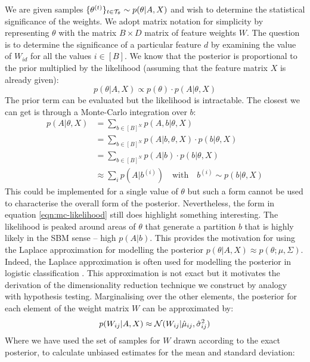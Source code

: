 We are given samples $\{\theta^{(t)}\}_{t \in \mathcal{T}_\theta} \sim p(\theta | A, X)$ and wish to determine the statistical significance of the weights. We adopt matrix notation for simplicity by representing $\theta$ with the matrix $B \times D$ matrix of feature weights $W$. The question is to determine the significance of a particular feature $d$ by examining the value of $W_{id}$ for all the values $i \in [B]$. We know that the posterior is proportional to the prior multiplied by the likelihood (assuming that the feature matrix $X$ is already given):
%
\begin{equation}
	p(\theta|A, X) \propto p(\theta) \cdot p(A | \theta, X)
\end{equation}
%
The prior term can be evaluated but the likelihood is intractable. The closest we can get is through a Monte-Carlo integration over $b$:
%
\begin{align}
	p(A | \theta, X) &= \sum_{b \in [B]^N} p(A, b | \theta, X) \nonumber \\
	&= \sum_{b \in [B]^N} p(A | b, \theta, X) \cdot p(b | \theta, X) \nonumber \\
	&= \sum_{b \in [B]^N} p(A | b) \cdot p(b | \theta, X) \nonumber \\
	&\approx \sum_{i} p\left( A | b^{(i)} \right) \quad \textrm{with} \quad b^{(i)} \sim p(b| \theta, X)
	\label{eqn:mc-likelihood}
\end{align}
%
This could be implemented for a single value of $\theta$ but such a form cannot be used to characterise the overall form of the posterior. Nevertheless, the form in equation \ref{eqn:mc-likelihood} still does highlight something interesting. The likelihood is peaked around areas of $\theta$ that generate a partition $b$ that is highly likely in the SBM sense -- high $p(A|b)$. This provides the motivation for using the Laplace approximation for modelling the posterior $p(\theta | A, X) \approx p(\theta; \mu, \Sigma)$. Indeed, the Laplace approximation is often used for modelling the posterior in logistic classification \cite{laplace}. This approximation is not exact but it motivates the derivation of the dimensionality reduction technique we construct by analogy with hypothesis testing. Marginalising over the other elements, the posterior for each element of the weight matrix $W$ can be approximated by:
%
\begin{equation}
	p(W_{ij}|A, X) \approx \mathcal{N}(W_{ij}|\hat{\mu}_{ij}, \hat{\sigma}_{ij}^2)
\end{equation}
%
Where we have used the set of samples for $W$ drawn according to the exact posterior, to calculate unbiased estimates for the mean and standard deviation:
